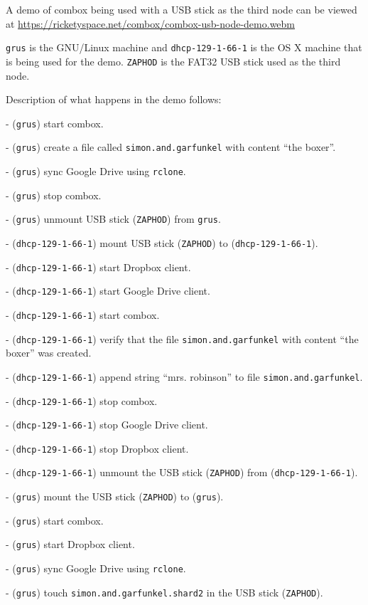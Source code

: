 A demo of combox being used with a USB stick as the third node can be
viewed at \url{https://ricketyspace.net/combox/combox-usb-node-demo.webm}

\verb+grus+ is the GNU/Linux machine and \verb+dhcp-129-1-66-1+ is the
OS X machine that is being used for the demo. \verb+ZAPHOD+ is the
FAT32 USB stick used as the third node.

Description of what happens in the demo follows:

  - (\verb+grus+) start combox.

  - (\verb+grus+) create a file called \verb+simon.and.garfunkel+ with
  content ``the boxer''.

  - (\verb+grus+) sync Google Drive using \verb+rclone+.

  - (\verb+grus+) stop combox.

  - (\verb+grus+) unmount USB stick (\verb+ZAPHOD+) from \verb+grus+.

  - (\verb+dhcp-129-1-66-1+) mount USB stick (\verb+ZAPHOD+) to
  (\verb+dhcp-129-1-66-1+).

  - (\verb+dhcp-129-1-66-1+) start Dropbox client.

  - (\verb+dhcp-129-1-66-1+) start Google Drive client.

  - (\verb+dhcp-129-1-66-1+) start combox.

  - (\verb+dhcp-129-1-66-1+) verify that the file
  \verb+simon.and.garfunkel+ with content ``the boxer'' was created.

  - (\verb+dhcp-129-1-66-1+) append string ``mrs. robinson'' to file
  \verb+simon.and.garfunkel+.

  - (\verb+dhcp-129-1-66-1+) stop combox.

  - (\verb+dhcp-129-1-66-1+) stop Google Drive client.

  - (\verb+dhcp-129-1-66-1+) stop Dropbox client.

  - (\verb+dhcp-129-1-66-1+) unmount the USB stick (\verb+ZAPHOD+)
  from (\verb+dhcp-129-1-66-1+).

  - (\verb+grus+) mount the USB stick (\verb+ZAPHOD+) to
  (\verb+grus+).

  - (\verb+grus+) start combox.

  - (\verb+grus+) start Dropbox client.

  - (\verb+grus+) sync Google Drive using \verb+rclone+.

  - (\verb+grus+) touch \verb+simon.and.garfunkel.shard2+ in the USB
  stick (\verb+ZAPHOD+).


